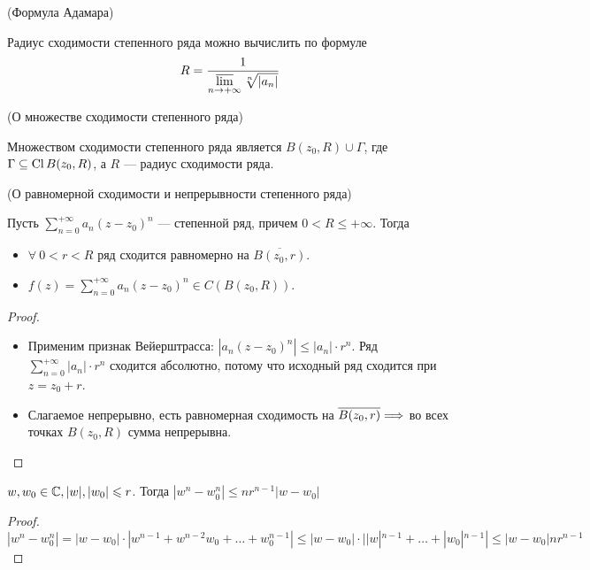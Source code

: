 \begin{corollary}(Формула Адамара)

    Радиус сходимости степенного ряда можно вычислить по формуле
\[
    R = \frac{1}{\displaystyle \varlimsup_{n \to +\infty}{\sqrt[n]{|a_n|}}}
\]
\end{corollary}

\begin{corollary}(О множестве сходимости степенного ряда)

    Множеством сходимости степенного ряда является $B(z_0, R) \cup \Gamma$,
    где $\Gamma \subseteq \operatorname{Cl}{B(z_0, R)}$, а $R$ --- радиус сходимости ряда.
\end{corollary}

\begin{theorem}(О равномерной сходимости и непрерывности степенного ряда)

    Пусть $\displaystyle \sum_{n = 0}^{+\infty}{a_n (z - z_0)^n}$ ---
    степенной ряд, причем $0 < R \leqslant +\infty$. Тогда
    \begin{itemize}
        \item $\forall~ 0 < r < R$ ряд сходится равномерно на $\overline{B(z_0,
        r)}$.
        \item $\displaystyle f(z) = \sum_{n = 0}^{+\infty}{a_n (z - z_0)^n}
        \in C(B(z_0, R))$.
    \end{itemize}
\end{theorem}
\begin{proof}
    \enewline
    \begin{itemize}
        \item Применим признак Вейерштрасса: $|a_n (z - z_0)^n| \leqslant |a_n|
        \cdot r^n$.
    Ряд $\displaystyle \sum_{n = 0}^{+\infty}{|a_n| \cdot r^n}$ сходится
    абсолютно, потому что исходный ряд сходится при $z = z_0 + r$.
        \item Слагаемое непрерывно, есть равномерная сходимость на
        $\overline{B(z_0, r)} \Longrightarrow$ во всех точках $B(z_0, R)$ сумма непрерывна.
    \end{itemize}
\end{proof}

\begin{lemma}
    $w, w_0 \in \mathbb{C}, |w|, |w_0| \leqslant r$. Тогда $|w^n - w^n_0|
    \leqslant nr^{n - 1}|w - w_0|$
\end{lemma}
\begin{proof}
\[
    |w^n - w^n_0| = |w - w_0| \cdot |w^{n - 1} + w^{n - 2}w_0 + \ldots +
    w^{n - 1}_0| \leqslant |w - w_0| \cdot ||w|^{n - 1} + \ldots + |w_0|^{n - 1}|
    \leqslant |w - w_0|nr^{n - 1}
\]
\end{proof}

